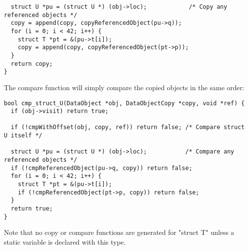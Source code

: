 \begin{docpart}
\begin{example}
\begin{verbatim}
  struct U *pu = (struct U *) (obj->loc);            /* Copy any referenced objects */
  copy = append(copy, copyReferencedObject(pu->q));
  for (i = 0; i < 42; i++) {
    struct T *pt = &(pu->t[i]);
    copy = append(copy, copyReferencedObject(pt->p));
  }
  return copy;
}
\end{verbatim}
The compare function will simply compare the copied objects in the
same order:
\begin{verbatim}
bool cmp_struct_U(DataObject *obj, DataObjectCopy *copy, void *ref) {
  if (obj->visit) return true;

  if (!cmpWithOffset(obj, copy, ref)) return false; /* Compare struct U itself */

  struct U *pu = (struct U *) (obj->loc);           /* Compare any referenced objects */
  if (!cmpReferencedObject(pu->q, copy)) return false;
  for (i = 0; i < 42; i++) {
    struct T *pt = &(pu->t[i]);
    if (!cmpReferencedObject(pt->p, copy)) return false;
  }
  return true;
}
\end{verbatim}
Note that no copy or compare functions are generated for "struct T"
unless a static variable is declared with this type.
\end{example}



\end{docpart}
